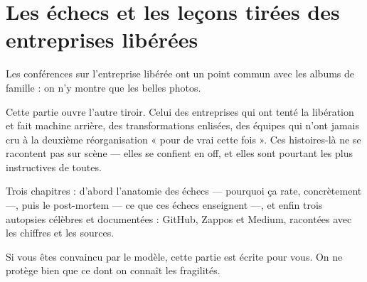 \part{Les échecs et les leçons tirées des entreprises libérées}

Les conférences sur l'entreprise libérée ont un point commun avec les albums de famille : on n'y montre que les belles photos.

Cette partie ouvre l'autre tiroir. Celui des entreprises qui ont tenté la libération et fait machine arrière, des transformations enlisées, des équipes qui n'ont jamais cru à la deuxième réorganisation « pour de vrai cette fois ». Ces histoires-là ne se racontent pas sur scène — elles se confient en off, et elles sont pourtant les plus instructives de toutes.

Trois chapitres : d'abord l'anatomie des échecs — pourquoi ça rate, concrètement —, puis le post-mortem — ce que ces échecs enseignent —, et enfin trois autopsies célèbres et documentées : GitHub, Zappos et Medium, racontées avec les chiffres et les sources.

Si vous êtes convaincu par le modèle, cette partie est écrite pour vous. On ne protège bien que ce dont on connaît les fragilités.

